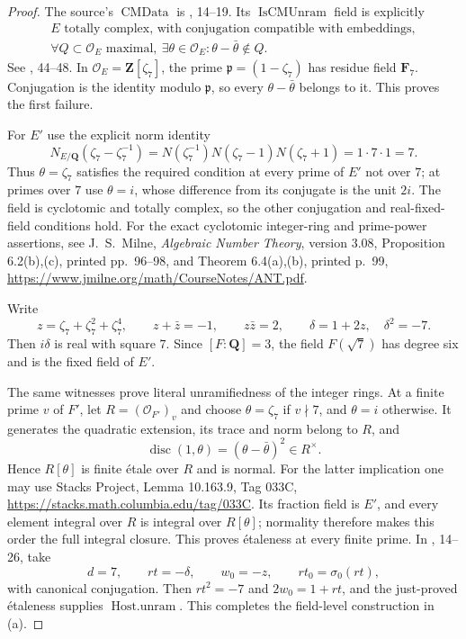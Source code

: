\begin{proof}
The source's $\operatorname{CMData}$ is
, 14--19.
Its $\operatorname{IsCMUnram}$ field is explicitly
\[
 \begin{gathered}
 E\text{ totally complex, with conjugation compatible with embeddings},
 \\
 \forall Q\subset\mathcal O_E\text{ maximal},\
       \exists\theta\in\mathcal O_E:
                    \theta-\bar\theta\notin Q.
 \end{gathered}
\]
See , 44--48.
In $\mathcal O_E=\mathbf Z[\zeta _7]$, the prime
$\mathfrak p=(1-\zeta _7)$ has residue field $\mathbf F_7$.
Conjugation is the identity modulo $\mathfrak p$, so every
$\theta-\bar\theta$ belongs to it. This proves the first failure.

For $E'$ use the explicit norm identity
\[
 N_{E/\mathbf Q}(\zeta _7-\zeta _7^{-1})
 =N(\zeta _7^{-1})N(\zeta _7-1)N(\zeta _7+1)
 =1\cdot7\cdot1=7.
\]
Thus $\theta=\zeta _7$ satisfies the required condition at every
prime of $E'$ not over $7$; at primes over $7$ use $\theta=i$,
whose difference from its conjugate is the unit $2i$.
The field is cyclotomic and totally complex, so the other
conjugation and real-fixed-field conditions hold.
For the exact cyclotomic integer-ring and prime-power assertions,
see J.\ S.\ Milne, \emph{Algebraic Number Theory}, version 3.08,
Proposition 6.2(b),(c), printed pp.~96--98,
and Theorem 6.4(a),(b), printed p.~99,
\url{https://www.jmilne.org/math/CourseNotes/ANT.pdf}.

Write
\[
 z=\zeta _7+\zeta _7^2+\zeta _7^4,\qquad
 z+\bar z=-1,\qquad z\bar z=2,\qquad
 \delta=1+2z,\quad\delta^2=-7.
\]
Then $i\delta$ is real with square $7$.
Since $[F:\mathbf Q]=3$, the field $F(\sqrt7)$ has degree six
and is the fixed field of $E'$.

The same witnesses prove literal unramifiedness of the integer rings.
At a finite prime $v$ of $F'$, let $R=(\mathcal O_{F'})_v$ and
choose $\theta=\zeta _7$ if $v\nmid7$, and $\theta=i$ otherwise.
It generates the quadratic extension, its trace and norm belong to $R$,
and
\[
 \operatorname{disc}(1,\theta)=(\theta-\bar\theta)^2\in R^\times.
\]
Hence $R[\theta]$ is finite étale over $R$ and is normal.
For the latter implication one may use Stacks Project,
Lemma 10.163.9, Tag 033C,
\url{https://stacks.math.columbia.edu/tag/033C}.
Its fraction field is $E'$, and every element integral over $R$
is integral over $R[\theta]$; normality therefore makes this order the
full integral closure. This proves étaleness at every finite prime.
In
,
14--26, take
\[
 d=7,\qquad rt=-\delta,\qquad w_0=-z,\qquad
 rt_0=\sigma_0(rt),
\]
with canonical conjugation. Then $rt^2=-7$ and $2w_0=1+rt$,
and the just-proved étaleness supplies $\operatorname{Host.unram}$.
This completes the field-level construction in (a).


\end{proof}
